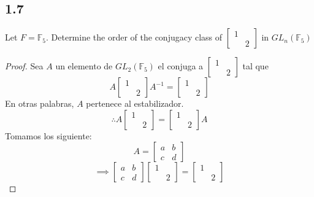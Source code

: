 \documentclass[11pt]{article}
\newcommand{\set}[1]{\mathbb{#1}}
\theoremstyle{definition}
\begin{document}
        \subsection{1.7}
        Let $F=\set{F}_5$. Determine the order of the conjugacy class of $\begin{bmatrix}
            1 &   \\
              & 2
        \end{bmatrix}$ in $GL_n(\set{F}_5)$
        \begin{proof}
            Sea $A$ un elemento de $GL_2(\set{F}_5)$ el conjuga a $\begin{bmatrix}
                1 &   \\
                  & 2
            \end{bmatrix}$ tal que
            \[A\begin{bmatrix}
                1 &   \\
                  & 2
            \end{bmatrix}A^{-1}=\begin{bmatrix}
                1 &   \\
                  & 2
            \end{bmatrix}\]
            En otras palabras, $A$ pertenece al estabilizador.
            \[\therefore A\begin{bmatrix}
                1 &   \\
                  & 2
            \end{bmatrix}=\begin{bmatrix}
                1 &   \\
                  & 2
            \end{bmatrix}A\]
            Tomamos los siguiente:
            \[A=\begin{bmatrix}
                a & b \\
                c & d
            \end{bmatrix}\]
            \[\implies \begin{bmatrix}
                a & b \\
                c & d
            \end{bmatrix}\begin{bmatrix}
                1 &   \\
                  & 2
            \end{bmatrix}=\begin{bmatrix}
                1 &   \\
                  & 2

\end{bmatrix}\]
\end{proof}
\end{document}
